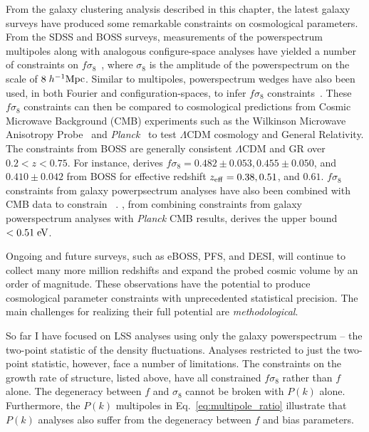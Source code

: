 From the galaxy clustering analysis described in this chapter, the latest 
galaxy surveys have produced some remarkable constraints on cosmological parameters. 
From the SDSS and BOSS surveys, measurements of the powerspectrum multipoles 
along with analogous configure-space analyses have yielded a number of constraints 
on $f\sigma_8$~\citep{Reid:2012aa, Oka:2014aa, Beutler:2014aa, Alam:2015aa, Alam:2016aa, Beutler:2016aa}, 
where $\sigma_8$ 
is the amplitude of the powerspectrum on the scale of $8\;h^{-1}{\rm Mpc}$. 
Similar to multipoles, powerspectrum wedges have also been used, in both 
Fourier and configuration-spaces, to infer $f\sigma_8$ 
constraints~\citep{Sanchez:2013aa, Sanchez:2016aa, Grieb:2016aa}. 
These $f \sigma_8$ constraints can then be compared to cosmological predictions 
from Cosmic Microwave Background (CMB) experiments such as the Wilkinson
Microwave Anisotropy Probe~\citep{WMAP:2013} and {\em Planck}~\citep{Planck:2014aa}
to test $\Lambda$CDM cosmology and General Relativity. 
The constraints from BOSS are generally consistent $\Lambda$CDM and GR over 
$0.2 < z < 0.75$.  For instance, \cite{Beutler:2016aa} derives 
$f\sigma_8 = 0.482 \pm 0.053, 0.455 \pm 0.050$, and $0.410 \pm 0.042$ from BOSS 
for effective redshift $z_{\rm eff} = 0.38, 0.51$, and $0.61$.
$f \sigma_8$ constraints from galaxy powerpsectrum analyses have also been 
combined with CMB data to constrain \mneut~\citep{Zhao:2013aa, Beutler:2014ab, Gil-Marin:2015aa}.
\cite{Beutler:2014ab}, from combining constraints from galaxy powerspectrum 
analyses with {\em Planck} CMB results, derives the upper bound \mneut$ < 0.51\;{\rm eV}$.

Ongoing and future surveys, such as eBOSS, PFS, and DESI, will 
continue to collect many more million redshifts and expand the probed cosmic 
volume by an order of magnitude. These observations have the potential to 
produce cosmological parameter constraints with unprecedented statistical 
precision. The main challenges for realizing their full potential are {\em methodological}.

So far I have focused on LSS analyses using only the galaxy powerspectrum 
-- the two-point statistic of the density fluctuations. Analyses restricted
to just the two-point statistic, however, face a number of limitations. 
The constraints on the growth rate of structure, listed above, have all 
constrained $f \sigma_8$ rather than $f$ alone. The degeneracy 
between $f$ and $\sigma_8$ cannot be broken with $P(k)$ alone. Furthermore, 
the $P(k)$ multipoles in Eq.~\ref{eq:multipole_ratio} illustrate that 
$P(k)$ analyses also suffer from the degeneracy between $f$ and bias 
parameters. 

